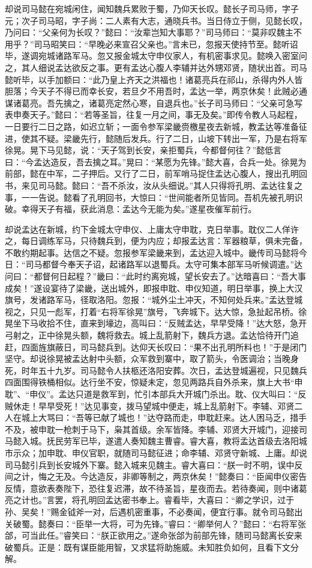 却说司马懿在宛城闲住，闻知魏兵累败于蜀，乃仰天长叹。懿长子司马师，字子元；次子司马昭，字子尚：二人素有大志，通晓兵书。当日侍立于侧，见懿长叹，乃问曰：“父亲何为长叹？”懿曰：“汝辈岂知大事耶？”司马师曰：“莫非叹魏主不用乎？”司马昭笑曰：“早晚必来宣召父亲也。”言未已，忽报天使持节至。懿听诏毕，遂调宛城诸路军马。忽又报金城太守申仪家人，有机密事求见。懿唤入密室问之，其人细说孟达欲反之事。更有孟达心腹人李辅并达外甥邓贤，随状出首。司马懿听毕，以手加额曰：“此乃皇上齐天之洪福也！诸葛亮兵在祁山，杀得内外人皆胆落；今天子不得已而幸长安，若旦夕不用吾时，孟达一举，两京休矣！此贼必通谋诸葛亮。吾先擒之，诸葛亮定然心寒，自退兵也。”长子司马师曰：“父亲可急写表申奏天子。”懿曰：“若等圣旨，往复一月之间，事无及矣。”即传令教人马起程，一日要行二日之路，如迟立斩；一面令参军梁畿赍檄星夜去新城，教孟达等准备征进，使其不疑。梁畿先行，懿随后发兵。行了二日，山坡下转出一军，乃是右将军徐晃。晃下马见懿，说：“天子驾到长安，亲拒蜀兵，今都督何往？”懿低言曰：“今孟达造反，吾去擒之耳。”晃曰：“某愿为先锋。”懿大喜，合兵一处。徐晃为前部，懿在中军，二子押后。又行了二日，前军哨马捉住孟达心腹人，搜出孔明回书，来见司马懿。懿曰：“吾不杀汝，汝从头细说。”其人只得将孔明、孟达往复之事，一一告说。懿看了孔明回书，大惊曰：“世间能者所见皆同。吾机先被孔明识破。幸得天子有福，获此消息：孟达今无能为矣。”遂星夜催军前行。

却说孟达在新城，约下金城太守申仪、上庸太守申耽，克日举事。耽仪二人佯许之，每日调练军马，只待魏兵到，便为内应；却报孟达言：军器粮草，俱未完备，不敢约期起事。达信之不疑。忽报参军梁畿来到，孟达迎入城中。畿传司马懿将今日：“司马都督今奉天子诏，起诸路军以退蜀兵。太守可集本部军马听候调遣。”达问曰：“都督何日起程？”畿曰：“此时约离宛城，望长安去了。”达暗喜曰：“吾大事成矣！”遂设宴待了梁畿，送出城外，即报申耽、申仪知道，明日举事，换上大汉旗号，发诸路军马，径取洛阳。忽报：“城外尘土冲天，不知何处兵来。”孟达登城视之，只见一彪军，打着“右将军徐晃”旗号，飞奔城下。达大惊，急扯起吊桥。徐晃坐下马收拾不住，直来到壕边，高叫曰：“反贼孟达，早早受降！”达大怒，急开弓射之，正中徐晃头额，魏将救去。城上乱箭射下，魏兵方退。孟达恰待开门追赶，四面旌旗蔽日，司马懿兵到。达仰天长叹曰：“果不出孔明所料也！”于是闭门坚守。却说徐晃被孟达射中头额，众军救到寨中，取了箭头，令医调治；当晚身死，时年五十九岁。司马懿令人扶柩还洛阳安葬。次日，孟达登城遍视，只见魏兵四面围得铁桶相似。达行坐不安，惊疑未定，忽见两路兵自外杀来，旗上大书“申耽”、“申仪”。孟达只道是救军到，忙引本部兵大开城门杀出。耽、仪大叫曰：“反贼休走！早早受死！”达见事变，拨马望城中便走，城上乱箭射下。李辅、邓贤二人在城上大骂曰：“吾等已献了城也！”达夺路而走，申耽赶来。达人困马乏，措手不及，被申耽一枪刺于马下，枭其首级。余军皆降。李辅、邓贤大开城门，迎接司马懿入城。抚民劳军已毕，遂遣人奏知魏主曹睿。睿大喜，教将孟达首级去洛阳城市示众；加申耽、申仪官职，就随司马懿征进；命李辅、邓贤守新城、上庸。却说司马懿引兵到长安城外下寨。懿入城来见魏主。睿大喜曰：“朕一时不明，误中反间之计，悔之无及。今达造反，非卿等制之，两京休矣！”懿奏曰：“臣闻申仪密告反情，意欲表奏陛下，恐往复迟滞，故不待圣旨，星夜而去。若待奏闻，则中诸葛亮之计也。”言罢，将孔明回孟达密书奉上。睿看毕，大喜曰：“卿之学识，过于孙、吴矣！”赐金钺斧一对，后遇机密重事，不必奏闻，便宜行事。就令司马懿出关破蜀。懿奏曰：“臣举一大将，可为先锋。”睿曰：“卿举何人？”懿曰：“右将军张郃，可当此任。”睿笑曰：“朕正欲用之。”遂命张郃为前部先锋，随司马懿离长安来破蜀兵。正是：既有谋臣能用智，又求猛将助施威。未知胜负如何，且看下文分解。